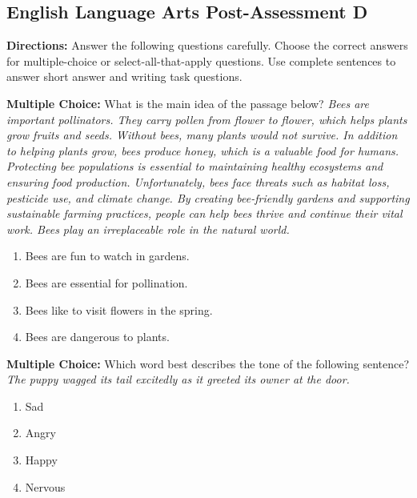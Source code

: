 \documentclass[12pt]{article}
\begin{document}
\subsection*{English Language Arts Post-Assessment D}
\onehalfspacing

\begin{tcolorbox}[colframe=black!50, colback=white, title=Assessment Directions]
\textbf{Directions:} Answer the following questions carefully. Choose the correct answers for multiple-choice or select-all-that-apply questions. Use complete sentences to answer short answer and writing task questions.
\end{tcolorbox}

\begin{tcolorbox}[colframe=black!50, colback=white, title=Question 1]
\textbf{Multiple Choice:} What is the main idea of the passage below?
\textit{Bees are important pollinators. They carry pollen from flower to flower, which helps plants grow fruits and seeds. Without bees, many plants would not survive. In addition to helping plants grow, bees produce honey, which is a valuable food for humans. Protecting bee populations is essential to maintaining healthy ecosystems and ensuring food production. Unfortunately, bees face threats such as habitat loss, pesticide use, and climate change. By creating bee-friendly gardens and supporting sustainable farming practices, people can help bees thrive and continue their vital work. Bees play an irreplaceable role in the natural world.}

\begin{enumerate}[label=(\Alph*)]
\item Bees are fun to watch in gardens.
\item Bees are essential for pollination.
\item Bees like to visit flowers in the spring.
\item Bees are dangerous to plants.
\end{enumerate}
\end{tcolorbox}

\begin{tcolorbox}[colframe=black!50, colback=white, title=Question 2]
\textbf{Multiple Choice:} Which word best describes the tone of the following sentence?
\textit{The puppy wagged its tail excitedly as it greeted its owner at the door.}

\begin{enumerate}[label=(\Alph*)]
\item Sad
\item Angry
\item Happy
\item Nervous
\end{enumerate}
\end{tcolorbox}
\end{document}
